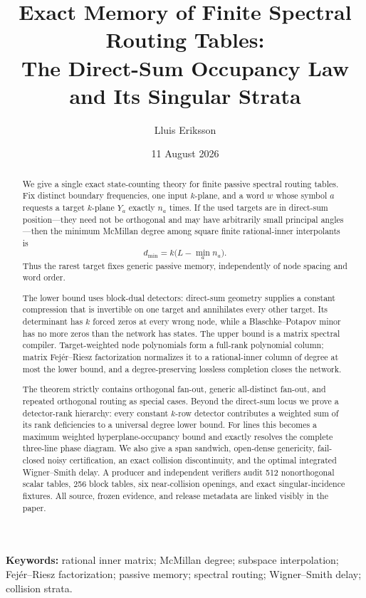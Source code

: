 \documentclass[11pt]{article}
\title{Exact Memory of Finite Spectral Routing Tables:\\
The Direct-Sum Occupancy Law and Its Singular Strata}
\author{Lluis Eriksson}
\date{11 August 2026}
\theoremstyle{definition}\newtheorem{definition}[theorem]{Definition}\newtheorem{example}[theorem]{Example}
\theoremstyle{remark}\newtheorem{remark}[theorem]{Remark}\newtheorem{limitation}[theorem]{Limitation}
\begin{document}
\maketitle

\begin{abstract}
We give a single exact state-counting theory for finite passive spectral
routing tables.  Fix distinct boundary frequencies, one input $k$-plane,
and a word $w$ whose symbol $a$ requests a target $k$-plane $Y_a$ exactly
$n_a$ times.  If the used targets are in direct-sum position---they need not
be orthogonal and may have arbitrarily small principal angles---then the
minimum McMillan degree among square finite rational-inner interpolants is
\[
             d_{\min}=k\bigl(L-\min_a n_a\bigr).
\]
Thus the rarest target fixes generic passive memory, independently of node
spacing and word order.

The lower bound uses block-dual detectors: direct-sum geometry supplies a
constant compression that is invertible on one target and annihilates every
other target.  Its determinant has $k$ forced zeros at every wrong node,
while a Blaschke--Potapov minor has no more zeros than the network has
states.  The upper bound is a matrix spectral compiler.  Target-weighted
node polynomials form a full-rank polynomial column; matrix
Fej\'er--Riesz factorization normalizes it to a rational-inner column of
degree at most the lower bound, and a degree-preserving lossless completion
closes the network.

The theorem strictly contains orthogonal fan-out, generic all-distinct
fan-out, and repeated orthogonal routing as special cases.  Beyond the
direct-sum locus we prove a detector-rank hierarchy: every constant
$k$-row detector contributes a weighted sum of its rank deficiencies to a
universal degree lower bound.  For lines this becomes a maximum weighted
hyperplane-occupancy bound and exactly resolves the complete three-line
phase diagram.  We also give a span sandwich, open-dense genericity,
fail-closed noisy certification, an exact collision discontinuity, and the
optimal integrated Wigner--Smith delay.  A producer and independent
verifiers audit 512 nonorthogonal scalar tables, 256 block tables, six
near-collision openings, and exact singular-incidence fixtures.  All source,
frozen evidence, and release metadata are linked visibly in the paper.
\end{abstract}

\noindent\textbf{Keywords:} rational inner matrix; McMillan degree;
subspace interpolation; Fej\'er--Riesz factorization; passive memory;
spectral routing; Wigner--Smith delay; collision strata.
\end{document}
